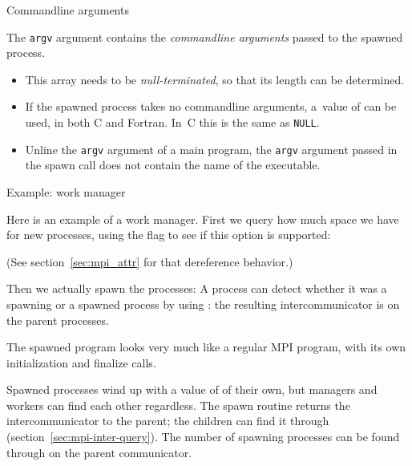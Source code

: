  {Commandline arguments}
\label{sec:mpi-spawn-args}

The \lstinline{argv} argument contains the 
\emph{commandline arguments}
passed to the spawned process.
\begin{itemize}
\item
  This array needs to be
  \emph{null-terminated},
  so that its length can be determined.
\item
  If the spawned process takes no commandline arguments,
  a~value of  can be used,
  in both C and Fortran.
  In~C this is the same as \lstinline{NULL}.
\item
  Unline the \lstinline{argv} argument of a main program,
  the \lstinline{argv} argument passed in the spawn call
  does not contain the name of the executable.
\end{itemize}
 {Example: work manager}

Here is an example of a work manager.
%
First we query how much space we have for new processes,
using the flag to see if this option is supported:
%

(See section~\ref{sec:mpi_attr} for that dereference behavior.)

Then we actually spawn the processes:
%
%
%
A process can detect whether it was a spawning or a spawned process
by using :
the resulting intercommunicator is 
on the parent processes.

The spawned program looks very much like a regular MPI program, with
its own initialization and finalize calls.

%

Spawned processes wind up with a value of  of their
own, but managers and workers can find each other regardless.
The spawn routine returns the intercommunicator to the parent; the children
can find it through  (section~\ref{sec:mpi-inter-query}).
The number of spawning processes can be found through
 on the parent communicator.

